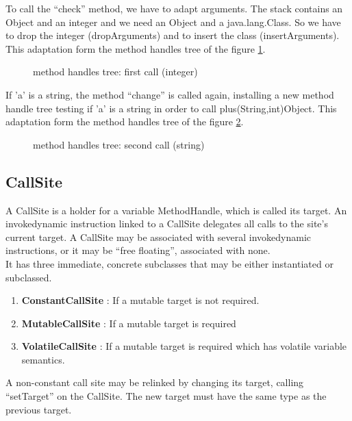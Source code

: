 \documentclass{sig-alternate}
\begin{document}
      To call the ``check'' method, we have to adapt arguments.
      The stack contains an Object and an integer and we need an Object and a java.lang.Class.
      So we have to drop the integer (dropArguments) and to insert the class (insertArguments).
      This adaptation form the method handles tree of the figure \ref{ast2}.

      \begin{figure}[!h]
        \centering \resizebox{\linewidth}{!}{}
        \caption{method handles tree: first call (integer)}
        \label{ast2}
      \end{figure}

      If 'a' is a string, the method ``change'' is called again,
      installing a new method handle tree testing if 'a' is a string in order to call plus(String,int)Object.
      This adaptation form the method handles tree of the figure \ref{ast3}.

      \begin{figure}
        \centering \resizebox{.8\linewidth}{!}{}
        \caption{method handles tree: second call (string)}
        \label{ast3}
      \end{figure}

    \subsection{CallSite}

      A CallSite is a holder for a variable MethodHandle, which is called its target.
      An invokedynamic instruction linked to a CallSite delegates all calls to the site's current target.
      A CallSite may be associated with several invokedynamic instructions,
      or it may be ``free floating'', associated with none.\\

      It has three immediate, concrete subclasses that may be either instantiated or subclassed.
      \begin{enumerate}
        \item \textbf{ConstantCallSite} : If a mutable target is not required.
        \item \textbf{MutableCallSite}  : If a mutable target is required
        \item \textbf{VolatileCallSite} : If a mutable target is required which has volatile variable semantics.
      \end{enumerate}
      A non-constant call site may be relinked by changing its target, calling ``setTarget'' on the CallSite.
      The new target must have the same type as the previous target.
\end{document}
